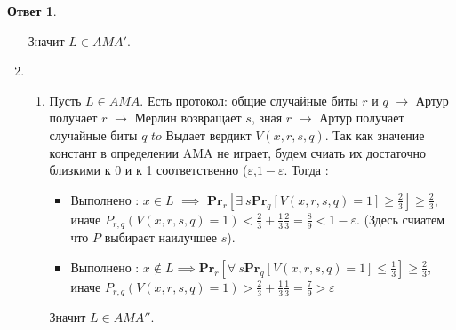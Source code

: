 \documentclass[a4paper]{article}
\theoremstyle{plain}
\theoremstyle{definition}
\newtheorem*{answer}{Ответ}
\begin{document}
\begin{answer}
\begin{enumerate}
\begin{itemize}
    \end{itemize}
    Значит $L \in  AMA'$. 
    \item 
    \begin{enumerate}
    \item Пусть $L \in  AMA$. Есть протокол: общие случайные биты $r$ и $q$ $\to$ Артур получает $r$ $\to$ Мерлин возвращает $s$, зная $r$ $\to$ Артур получает случайные биты $q$ $to$ Выдает вердикт $V(x,r,s,q)$. Так как значение констант в определении AMA не играет, будем счиать их достаточно близкими к 0 и к 1 соответственно ($\varepsilon$,$1 - \varepsilon$. Тогда : 
    \begin{itemize}
      \item Выполнено : $x \in L$ $\implies$ $\mathbf{Pr}_r[\exists\ s \mathbf{Pr}_q [V(x,r,s,q)=1] \geq \frac{2}{3}] \geq \frac{2}{3}$, иначе $P_{r,q}(V(x,r,s,q) = 1) < \frac{2}{3} + \frac{1}{3} \frac{2}{3} = \frac{8}{9} < 1 - \varepsilon$. (Здесь счиатем что $P$ выбирает наилучшее $s$).
      \item  Выполнено : $x \notin L \implies \mathbf{Pr}_r[\forall\ s \mathbf{Pr}_q [V(x,r,s,q)=1] \leq \frac{1}{3}] \geq \frac{2}{3}$, иначе $P_{r,q}(V(x,r,s,q) = 1) > \frac{2}{3} + \frac{1}{3} \frac{1}{3} = \frac{7}{9} > \varepsilon$
    \end{itemize}
    Значит $L \in AMA''$.


\end{enumerate}
\end{enumerate}
\end{answer}
\end{document}
